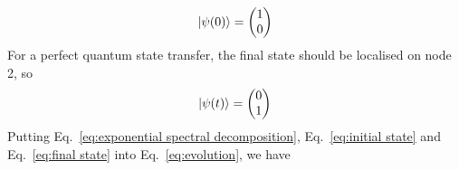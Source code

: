 \documentclass[aps]{revtex4-2}
\DeclarePairedDelimiter\ket{\lvert}{\rangle}
\begin{document}
\begin{equation}
    \label{eq:initial state}
    \ket{\psi(0)}=\begin{pmatrix}
        1\\
        0
    \end{pmatrix}
\end{equation}
For a perfect quantum state transfer, the final state should be localised on node 2, so
\begin{equation}
    \label{eq:final state}
    \ket{\psi(t)}=\begin{pmatrix}
        0\\
        1
    \end{pmatrix}
\end{equation}
Putting Eq.~\ref{eq:exponential spectral decomposition}, Eq.~\ref{eq:initial state} and Eq.~\ref{eq:final state} into Eq.~\ref{eq:evolution}, we have
\end{document}
